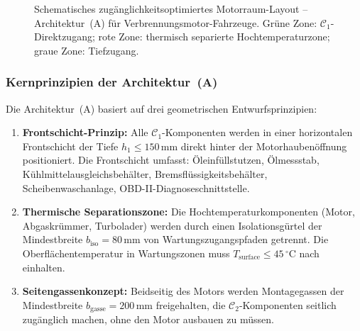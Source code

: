 ﻿\documentclass[12pt,a4paper]{article}
\begin{document}
\begin{figure}[H]
	\caption{Schematisches zugänglichkeitsoptimiertes Motorraum-Layout -- Architektur~(A)
		für Verbrennungsmotor-Fahrzeuge. Grüne Zone: $\mathcal{C}_1$-Direktzugang;
		rote Zone: thermisch separierte Hochtemperaturzone; graue Zone: Tiefzugang.}
	\label{fig:layout_a}
\end{figure}

\subsubsection{Kernprinzipien der Architektur~(A)}

Die Architektur~(A) basiert auf drei geometrischen Entwurfsprinzipien:

\begin{enumerate}[leftmargin=*, label=(P\arabic*)]
	\item \textbf{Frontschicht-Prinzip:} Alle $\mathcal{C}_1$-Komponenten werden
	in einer horizontalen Frontschicht der Tiefe $h_1 \leq 150\,\mathrm{mm}$
	direkt hinter der Motorhaubenöffnung positioniert. Die Frontschicht umfasst:
	Öleinfüllstutzen, Ölmessstab, Kühlmittelausgleichsbehälter, Bremsflüssigkeitsbehälter,
	Scheibenwaschanlage, OBD-II-Diagnoseschnittstelle.

	\item \textbf{Thermische Separationszone:} Die Hochtemperaturkomponenten
	(Motor, Abgaskrümmer, Turbolader) werden durch einen Isolationsgürtel der
	Mindestbreite $b_\mathrm{iso} = 80\,\mathrm{mm}$ von Wartungszugangspfaden
	getrennt. Die Oberflächentemperatur in Wartungszonen muss
	$T_\mathrm{surface} \leq 45\,^\circ\mathrm{C}$ nach \cite{EN13202} einhalten.

	\item \textbf{Seitengassenkonzept:} Beidseitig des Motors werden Montagegassen
	der Mindestbreite $b_\mathrm{gasse} = 200\,\mathrm{mm}$ freigehalten,
	die $\mathcal{C}_2$-Komponenten seitlich zugänglich machen, ohne den
	Motor ausbauen zu müssen.
\end{enumerate}
\end{document}
